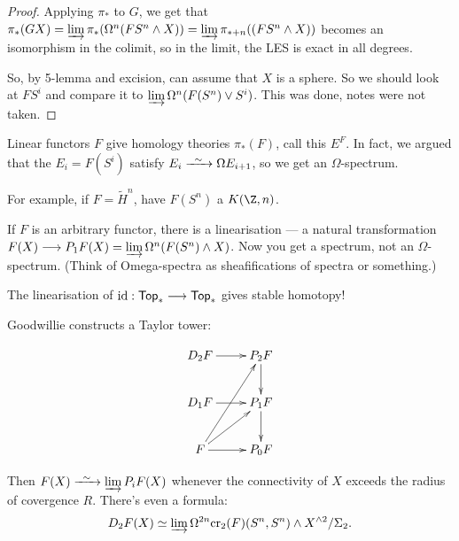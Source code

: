 \begin{BehrensGoodwillieCalcIntro}
\begin{proof}
Applying $\pi_*$ to $G$, we get that $\pi_*(GX)=\varinjlim\pi_*(\Omega^n(FS^n\wedge X))=\varinjlim\pi_{*+n}((FS^n\wedge X))$ becomes an isomorphism in the colimit, so in the limit, the LES is exact in all degrees.

So, by 5-lemma and excision, can assume that $X$ is a sphere. So we should look at $FS^i$ and compare it to $\varinjlim \Omega^n(F(S^n)\vee S^i)$. This was done, notes were not taken.
\end{proof}
Linear functors  $F$ give homology theories $\pi_*(F)$, call this $E^F$. In fact, we argued that the $E_i=F(S^i)$ satisfy $E_i\weakequiv \Omega E_{i+1}$, so we get an $\Omega$-spectrum.

For example, if $F=\widetilde{H}^n$, have $F(S^n)$ a $K(\Z,n)$.

If $F$ is an arbitrary functor, there is a linearisation --- a natural transformation $F(X)\longrightarrow P_1F(X)=\varinjlim\Omega^n(F(S^n)\wedge X)$. Now you get a spectrum, not an $\Omega$-spectrum. (Think of Omega-spectra as sheafifications of spectra or something.)
\begin{exmp*}
The linearisation of $\textup{id}:\operatorname{{\mathsf{Top}}}_*\longrightarrow\operatorname{{\mathsf{Top}}}_*$ gives stable homotopy!
\end{exmp*}


Goodwillie constructs a Taylor tower:

\[\xymatrix{
D_2F\ar[r]&\ar[d]P_2F\\
D_1F\ar[r]&\ar[d]P_1F\\
F\ar[r]\ar[ru]\ar[ruu]&P_0F
}
\]

Then $F(X)\weakequiv \varinjlim P_iF(X)$ whenever the connectivity of $X$ exceeds the radius of covergence $R$. There's even a formula:
\[D_2F(X)\simeq\varinjlim \Omega^{2n}\textup{cr}_2(F)(S^n,S^n)\wedge X^{\wedge2}/\Sigma_2.\]

\pagebreak
\end{BehrensGoodwillieCalcIntro}


